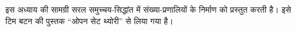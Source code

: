 \documentclass[../../../include/open-logic-section]{subfiles}
\begin{document}
	

\begin{editorial}
इस अध्याय की सामग्री सरल समुच्चय-सिद्धांत में संख्या-प्रणालियों के निर्माण को
प्रस्तुत करती है। इसे टिम बटन की पुस्तक ``ओपन सेट थ्योरी'' से लिया गया है।
\end{editorial}


\OLEndChapterHook
\end{document}
